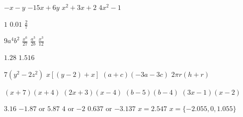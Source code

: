 \begin{Answer}[ref={ex11}]
\Question %
\begin{tasks}
	\task 	 $-x -y $ 
	\task    $-15x+6y $
	\task 	 $x^{2} +3 x +2$
	\task    $4 x^{2} -1$
\end{tasks}
 	
\Question %
\begin{tasks}
	\task 	 $1$
	\task    $0.01$
	\task $\frac{2}{7}$
\end{tasks}

\Question %
\begin{tasks}
	\task 	 $9 a^{4} b^{2}$
	\task    $\frac{x^{6}}{27}$
	\task 	$\frac{a^3}{2b}$
	\task	$\frac{x^3}{12}$
\end{tasks}

\Question %
\begin{tasks}
	\task 	 $1.28$
	\task    $1.516$
\end{tasks}

\Question %
\begin{tasks}
	\task 	$7(y^2-2z^2)$ 
	\task  $x[(y-2)+x]$
	\task $(a+c)(-3a-3c)$
	\task $2\pi r(h+r)$
\end{tasks}

\Question %
\begin{tasks}
	\task 	 $\left (x +7\right ) \left (x +4\right )$
	\task    $\left (2 x +3\right ) \left (x -4\right )$
	\task	$(b-5)(b-4)$
	\task	$(3x-1)(x-2)$
\end{tasks}

\Question %
\begin{tasks}
	\task 	$3.16$
	\task   $ -1.87$ or $5.87$
	\task 	$4$ or $ -2$
	\task   $0.637$ or $ -3.137$ 
	\task 	$x=2.547$
	\task 	$x=\{-2.055,0,1.055\}$
\end{tasks}
\end{Answer}
